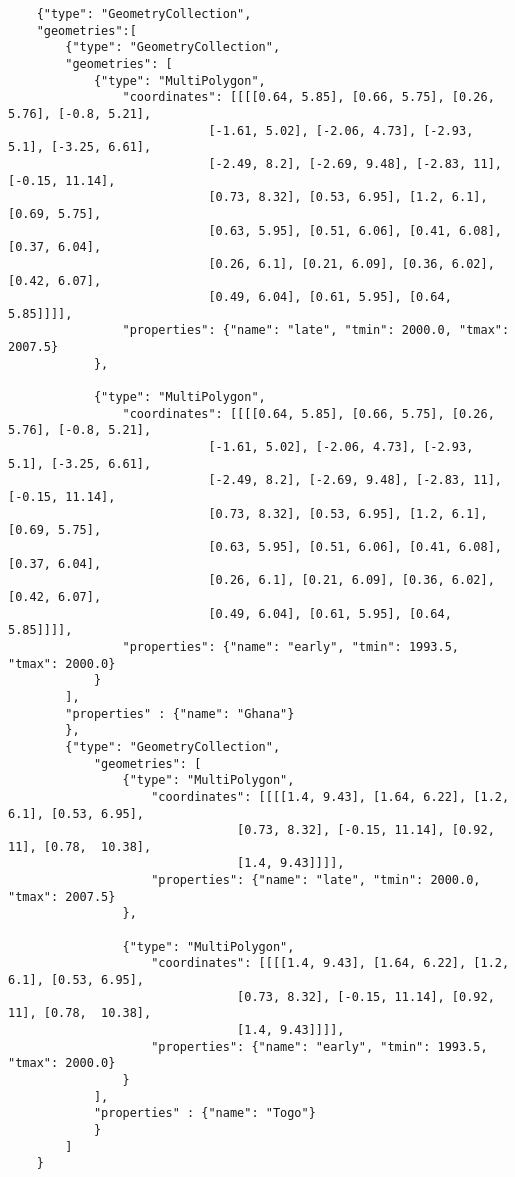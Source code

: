 \begin{verbatim}
    {"type": "GeometryCollection",
    "geometries":[
        {"type": "GeometryCollection",
        "geometries": [
            {"type": "MultiPolygon", 
                "coordinates": [[[[0.64, 5.85], [0.66, 5.75], [0.26, 5.76], [-0.8, 5.21], 
                            [-1.61, 5.02], [-2.06, 4.73], [-2.93, 5.1], [-3.25, 6.61], 
                            [-2.49, 8.2], [-2.69, 9.48], [-2.83, 11], [-0.15, 11.14], 
                            [0.73, 8.32], [0.53, 6.95], [1.2, 6.1], [0.69, 5.75], 
                            [0.63, 5.95], [0.51, 6.06], [0.41, 6.08], [0.37, 6.04], 
                            [0.26, 6.1], [0.21, 6.09], [0.36, 6.02], [0.42, 6.07], 
                            [0.49, 6.04], [0.61, 5.95], [0.64, 5.85]]]], 
                "properties": {"name": "late", "tmin": 2000.0, "tmax": 2007.5}
            },

            {"type": "MultiPolygon", 
                "coordinates": [[[[0.64, 5.85], [0.66, 5.75], [0.26, 5.76], [-0.8, 5.21], 
                            [-1.61, 5.02], [-2.06, 4.73], [-2.93, 5.1], [-3.25, 6.61], 
                            [-2.49, 8.2], [-2.69, 9.48], [-2.83, 11], [-0.15, 11.14], 
                            [0.73, 8.32], [0.53, 6.95], [1.2, 6.1], [0.69, 5.75], 
                            [0.63, 5.95], [0.51, 6.06], [0.41, 6.08], [0.37, 6.04], 
                            [0.26, 6.1], [0.21, 6.09], [0.36, 6.02], [0.42, 6.07], 
                            [0.49, 6.04], [0.61, 5.95], [0.64, 5.85]]]], 
                "properties": {"name": "early", "tmin": 1993.5, "tmax": 2000.0}
            }
        ],
        "properties" : {"name": "Ghana"}
        },
        {"type": "GeometryCollection",
            "geometries": [
                {"type": "MultiPolygon", 
                    "coordinates": [[[[1.4, 9.43], [1.64, 6.22], [1.2, 6.1], [0.53, 6.95], 
                                [0.73, 8.32], [-0.15, 11.14], [0.92, 11], [0.78,  10.38], 
                                [1.4, 9.43]]]], 
                    "properties": {"name": "late", "tmin": 2000.0, "tmax": 2007.5}
                },

                {"type": "MultiPolygon", 
                    "coordinates": [[[[1.4, 9.43], [1.64, 6.22], [1.2, 6.1], [0.53, 6.95], 
                                [0.73, 8.32], [-0.15, 11.14], [0.92, 11], [0.78,  10.38], 
                                [1.4, 9.43]]]], 
                    "properties": {"name": "early", "tmin": 1993.5, "tmax": 2000.0}
                }
            ],
            "properties" : {"name": "Togo"}
            }
        ]
    }
\end{verbatim}

